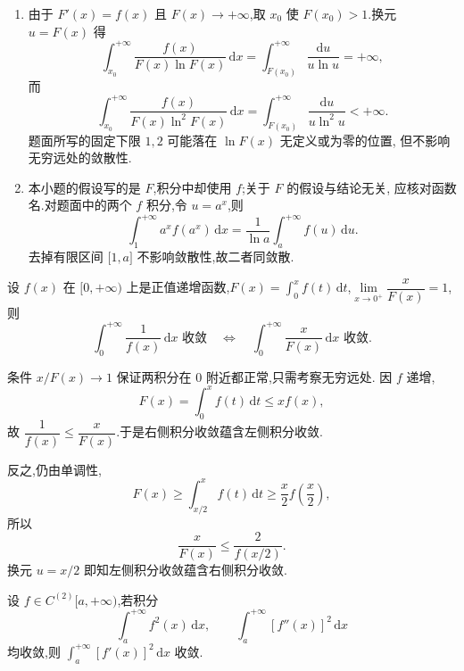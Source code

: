 \begin{solution}
  \begin{enumerate}
    \item 由于 $F'(x)=f(x)$ 且 $F(x)\to+\infty$,取 $x_0$ 使
          $F(x_0)>1$.换元 $u=F(x)$ 得
          \[
            \int_{x_0}^{+\infty}\dfrac{f(x)}{F(x)\ln F(x)}\,\mathrm{d}x
            =\int_{F(x_0)}^{+\infty}\dfrac{\mathrm{d}u}{u\ln u}=+\infty,
          \]
          而
          \[
            \int_{x_0}^{+\infty}\dfrac{f(x)}{F(x)\ln^2F(x)}\,\mathrm{d}x
            =\int_{F(x_0)}^{+\infty}\dfrac{\mathrm{d}u}{u\ln^2u}<+\infty.
          \]
          题面所写的固定下限 $1,2$ 可能落在 $\ln F(x)$ 无定义或为零的位置,
          但不影响无穷远处的敛散性.

    \item 本小题的假设写的是 $F$,积分中却使用 $f$;关于 $F$ 的假设与结论无关,
          应核对函数名.对题面中的两个 $f$ 积分,令 $u=a^x$,则
          \[
            \int_1^{+\infty}a^xf(a^x)\,\mathrm{d}x
            =\dfrac{1}{\ln a}\int_a^{+\infty}f(u)\,\mathrm{d}u.
          \]
          去掉有限区间 $\lbrack1,a\rbrack$ 不影响敛散性,故二者同敛散.
  \end{enumerate}
\end{solution}

\begin{example}
  设 $f(x)$ 在 $\lbrack 0,+\infty)$ 上是正值递增函数,$\displaystyle F(x)=\int_0^xf(t)\,\mathrm{d}t$,$\displaystyle\lim\limits_{x\to0^+}\dfrac{x}{F(x)}=1$,则
  \[
    \int_0^{+\infty}\dfrac{1}{f(x)}\,\mathrm{d}x\text{ 收敛}
    \quad\Longleftrightarrow\quad
    \int_0^{+\infty}\dfrac{x}{F(x)}\,\mathrm{d}x\text{ 收敛}.
  \]
\end{example}
\exampleblank

\begin{solution}
  条件 $x/F(x)\to1$ 保证两积分在 $0$ 附近都正常,只需考察无穷远处.
  因 $f$ 递增,
  \[
    F(x)=\int_0^xf(t)\,\mathrm{d}t\leq xf(x),
  \]
  故 $\dfrac{1}{f(x)}\leq\dfrac{x}{F(x)}$.于是右侧积分收敛蕴含左侧积分收敛.

  反之,仍由单调性,
  \[
    F(x)\geq\int_{x/2}^xf(t)\,\mathrm{d}t\geq\dfrac{x}{2}f\left(\dfrac{x}{2}\right),
  \]
  所以
  \[
    \dfrac{x}{F(x)}\leq\dfrac{2}{f(x/2)}.
  \]
  换元 $u=x/2$ 即知左侧积分收敛蕴含右侧积分收敛.
\end{solution}

\begin{example}
  设 $f\in C^{(2)}\lbrack a,+\infty)$,若积分
  \[
    \int_a^{+\infty}f^2(x)\,\mathrm{d}x,
    \qquad
    \int_a^{+\infty}[f''(x)]^2\,\mathrm{d}x
  \]
  均收敛,则 $\displaystyle\int_a^{+\infty}[f'(x)]^2\,\mathrm{d}x$ 收敛.
\end{example}
\exampleblank

